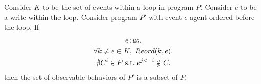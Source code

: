 \begin{corollary}
    \label{LoopInvCodeMotWrite1}
    Consider $K$ to be the set of events within a loop in program $P$. 
    Consider $e$ to be a write within the loop. 
    Consider program $P'$ with event $e$ agent ordered before the loop. 
    If
    \begin{gather}
        e\!:\!\textit{uo}. \label{licmw1:eq1}\\
        \forall k \neq e \in K, \ Reord(k, e). \label{licmw1:eq2} \\ 
        \nexists C^i \in P \ \text{s.t.} \ e^{j<=i} \notin C.  \label{licmw1:eq3}                    
    \end{gather}
    then the set of observable behaviors of $P'$ is a subset of $P$.

\end{corollary}             

